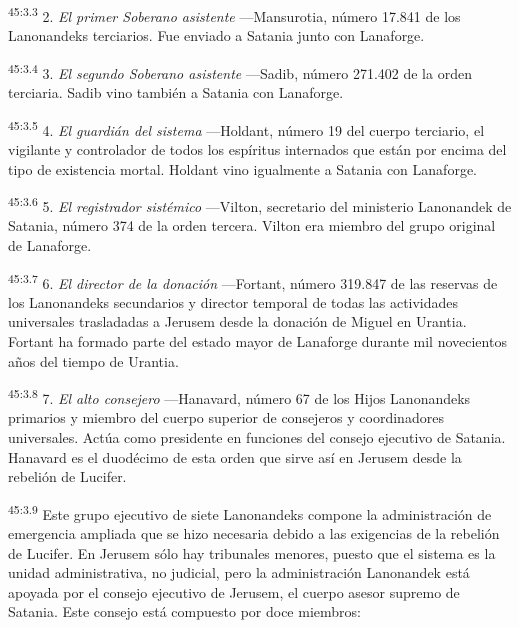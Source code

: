 \par
\textsuperscript{45:3.3} 2. \textit{El primer Soberano asistente} ---Mansurotia, número 17.841 de los Lanonandeks terciarios. Fue enviado a Satania junto con Lanaforge.

\par
\textsuperscript{45:3.4} 3. \textit{El segundo Soberano asistente} ---Sadib, número 271.402 de la orden terciaria. Sadib vino también a Satania con Lanaforge.

\par
\textsuperscript{45:3.5} 4. \textit{El guardián del sistema} ---Holdant, número 19 del cuerpo terciario, el vigilante y controlador de todos los espíritus internados que están por encima del tipo de existencia mortal. Holdant vino igualmente a Satania con Lanaforge.

\par
\textsuperscript{45:3.6} 5. \textit{El registrador sistémico} ---Vilton, secretario del ministerio Lanonandek de Satania, número 374 de la orden tercera. Vilton era miembro del grupo original de Lanaforge.

\par
\textsuperscript{45:3.7} 6. \textit{El director de la donación} ---Fortant, número 319.847 de las reservas de los Lanonandeks secundarios y director temporal de todas las actividades universales trasladadas a Jerusem desde la donación de Miguel en Urantia. Fortant ha formado parte del estado mayor de Lanaforge durante mil novecientos años del tiempo de Urantia.

\par
\textsuperscript{45:3.8} 7. \textit{El alto consejero} ---Hanavard, número
67 de los Hijos Lanonandeks primarios y miembro del cuerpo superior de consejeros y coordinadores universales. Actúa como presidente en funciones del consejo ejecutivo de Satania. Hanavard es el duodécimo de esta orden que sirve así en Jerusem desde la rebelión de Lucifer.

\par
\textsuperscript{45:3.9} Este grupo ejecutivo de siete Lanonandeks compone la administración de emergencia ampliada que se hizo necesaria debido a las exigencias de la rebelión de Lucifer. En Jerusem sólo hay tribunales menores, puesto que el sistema es la unidad administrativa, no judicial, pero la administración Lanonandek está apoyada por el consejo ejecutivo de Jerusem, el cuerpo asesor supremo de Satania. Este consejo está compuesto por doce miembros:

